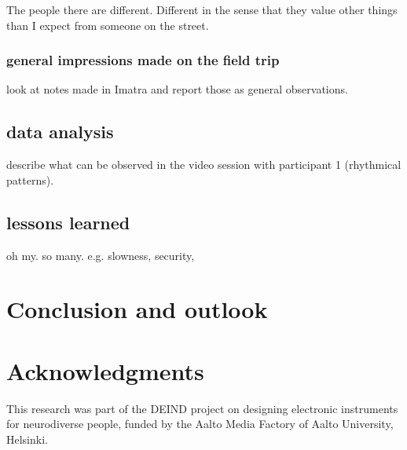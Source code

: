 \documentclass{chi-ext}
\begin{document}
\begin{multicols}{2}
The people there are different. Different in the sense that they value other things than I expect from someone on the street.




\subsubsection{general impressions made on the field trip}
\label{ssub:general_impressions_made_on_the_field_trip}

look at notes made in Imatra and report those as general observations.


\subsection{data analysis}
\label{sub:data_analysis}

describe what can be observed in the video session with participant 1 (rhythmical patterns).




\subsection{lessons learned}
\label{sub:lessons_learned}

oh my. so many.
e.g. 
slowness,
security,







\section{Conclusion and outlook}
\label{sec:conclusion_and_outlook}




\section{Acknowledgments}
This research was part of the DEIND project on designing electronic instruments for neurodiverse people, funded by the Aalto Media Factory of Aalto University, Helsinki.  


~\nocite{cappelen2012-mus,herstad2012-wha,herstad2012-mak,green2011agility,kleimola2011-vec,kleimola2010-fee,parker2011-a-s,parker2010-mod,valimaki2010-par,straus2011-ext,hegarty2006-noi,gurevich2007expression,burrows2010choreographer,bown2009understanding,jaarsma2012autism,hammel2011teaching,fard2012-wit,baggs2007-in,sinclair1993-don,wishart1994-aud,headlam2006-lea,2006-sou,campo2009-microsound,campo2009-the,m.-baalman2009-the,campo2008-objMod,wcd2011-scbook}



 

\end{multicols}
\end{document}
